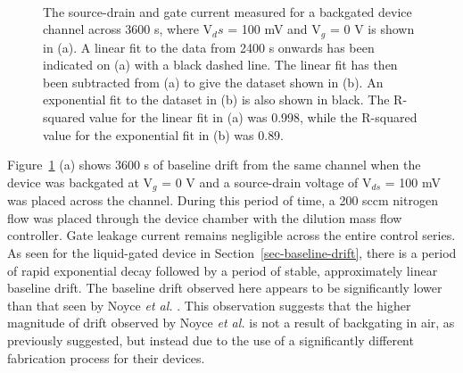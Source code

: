 \documentclass[
  a4paper,
]{scrbook}
\begin{document}
\begin{figure}
\begin{minipage}[t]{0.70\linewidth}
{}

\end{minipage}%
%
\begin{minipage}[t]{0.15\linewidth}

{\centering 

~

}

\end{minipage}%

\caption{\label{fig-bg-baseline-drift}The source-drain and gate current
measured for a backgated device channel across 3600 s, where V\(_ds\) =
100 mV and V\(_g\) = 0 V is shown in (a). A linear fit to the data from
2400 s onwards has been indicated on (a) with a black dashed line. The
linear fit has then been subtracted from (a) to give the dataset shown
in (b). An exponential fit to the dataset in (b) is also shown in black.
The R-squared value for the linear fit in (a) was 0.998, while the
R-squared value for the exponential fit in (b) was 0.89.}

\end{figure}

Figure~\ref{fig-bg-baseline-drift} (a) shows 3600 s of baseline drift
from the same channel when the device was backgated at V\(_g\) = 0 V and
a source-drain voltage of V\(_{ds}\) = 100 mV was placed across the
channel. During this period of time, a 200 sccm nitrogen flow was placed
through the device chamber with the dilution mass flow controller. Gate
leakage current remains negligible across the entire control series. As
seen for the liquid-gated device in Section~\ref{sec-baseline-drift},
there is a period of rapid exponential decay followed by a period of
stable, approximately linear baseline drift. The baseline drift observed
here appears to be significantly lower than that seen by Noyce \emph{et
al.} \autocite{Noyce2019}. This observation suggests that the higher
magnitude of drift observed by Noyce \emph{et al.} is not a result of
backgating in air, as previously suggested, but instead due to the use
of a significantly different fabrication process for their devices.
\end{document}
